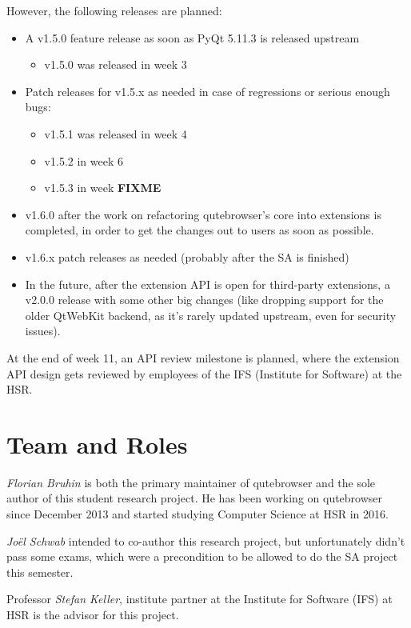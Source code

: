 \documentclass[a4paper,parskip=full]{scrreprt}
\newcommand{\fixme}[1]{\textbf{FIXME} \emph{#1}}
\begin{document}
However, the following releases are planned:

\begin{itemize}
  \item A v1.5.0 feature release as soon as PyQt 5.11.3 is released upstream
    \begin{itemize}
      \item v1.5.0 was released in week 3
    \end{itemize}
  \item Patch releases for v1.5.x as needed in case of regressions or serious
    enough bugs:
    \begin{itemize}
      \item v1.5.1 was released in week 4
      \item v1.5.2 in week 6
      \item v1.5.3 in week \fixme{}
    \end{itemize}
  \item v1.6.0 after the work on refactoring qutebrowser's core into extensions
    is completed, in order to get the changes out to users as soon as possible.
  \item v1.6.x patch releases as needed (probably after the SA is finished)
  \item In the future, after the extension API is open for third-party
    extensions, a v2.0.0 release with some other big changes (like dropping support
    for the older QtWebKit backend, as it's rarely updated upstream, even for
    security issues).
\end{itemize}

At the end of week 11, an API review milestone is planned, where the extension
API design gets reviewed by employees of the IFS (Institute for Software) at the
HSR.

\section{Team and Roles}
\emph{Florian Bruhin} is both the primary maintainer of qutebrowser and the
sole author of this student research project. He has been working on qutebrowser since
December 2013 and started studying Computer Science at HSR in 2016.

\emph{Joël Schwab} intended to co-author this research project, but
unfortunately didn't pass some exams, which were a precondition to be allowed to
do the SA project this semester.

Professor \emph{Stefan Keller}, institute partner at the Institute for Software
(IFS) at HSR is the advisor for this project.
\end{document}
